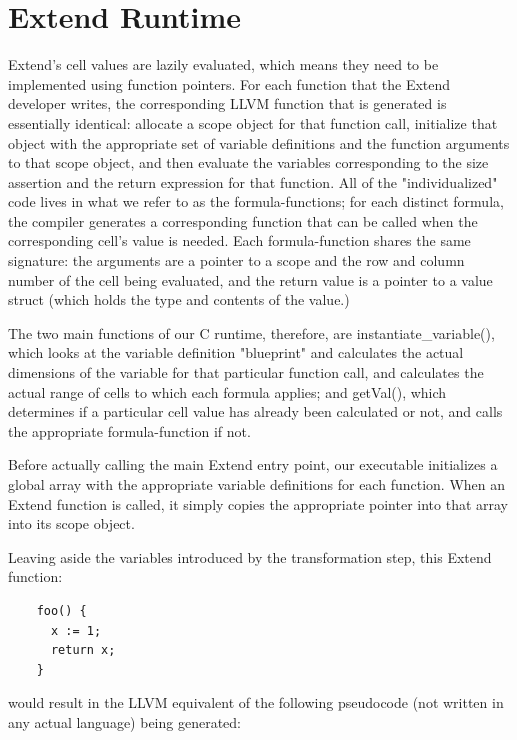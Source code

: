   \section{Extend Runtime}
  Extend's cell values are lazily evaluated, which means they need to be implemented using function pointers. For each function that the Extend developer writes, the corresponding LLVM function that is generated is essentially identical: allocate a scope object for that function call, initialize that object with the appropriate set of variable definitions and the function arguments to that scope object, and then evaluate the variables corresponding to the size assertion and the return expression for that function. All of the "individualized" code lives in what we refer to as the formula-functions; for each distinct formula, the compiler generates a corresponding function that can be called when the corresponding cell's value is needed. Each formula-function shares the same signature: the arguments are a pointer to a scope and the row and column number of the cell being evaluated, and the return value is a pointer to a value struct (which holds the type and contents of the value.)

  The two main functions of our C runtime, therefore, are instantiate\_variable(), which looks at the variable definition "blueprint" and calculates the actual dimensions of the variable for that particular function call, and calculates the actual range of cells to which each formula applies; and getVal(), which determines if a particular cell value has already been calculated or not, and calls the appropriate formula-function if not.

  Before actually calling the main Extend entry point, our executable initializes a global array with the appropriate variable definitions for each function. When an Extend function is called, it simply copies the appropriate pointer into that array into its scope object.

  Leaving aside the variables introduced by the transformation step, this Extend function:
  \begin{lstlisting}
    foo() {
      x := 1;
      return x;
    }
  \end{lstlisting}
  \medskip \noindent
  would result in the LLVM equivalent of the following pseudocode (not written in any actual language) being generated:


